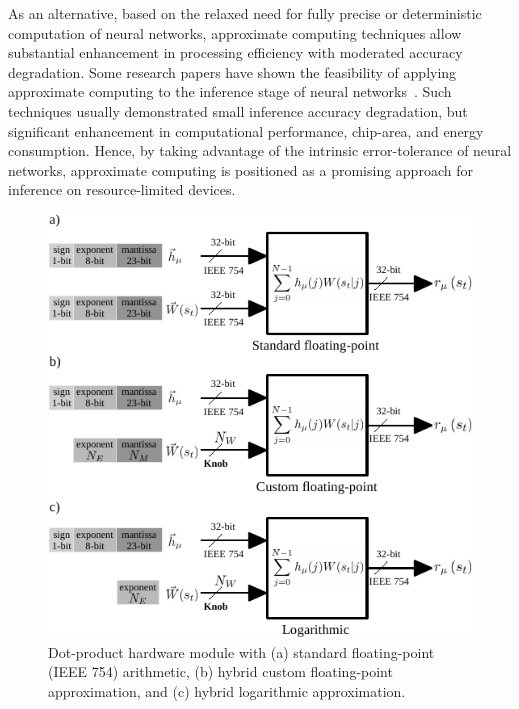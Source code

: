 As an alternative, based on the relaxed need for fully precise or deterministic computation of neural networks, approximate computing techniques allow substantial enhancement in processing efficiency with moderated accuracy degradation. Some research papers have shown the feasibility of applying approximate computing to the inference stage of neural networks~\cite{lotrivc2012applicability, sarwar2016multiplier, mrazek2016design, du2014leveraging}. Such techniques usually demonstrated small inference accuracy degradation, but significant enhancement in computational performance, chip-area, and energy consumption. Hence, by taking advantage of the intrinsic error-tolerance of neural networks, approximate computing is positioned as a promising approach for inference on resource-limited devices.

\begin{figure}[b!]
	\centering
	\includegraphics[width=0.5\columnwidth]{./chapters/sbs_accelerator/figures/dot-product_unit.pdf}
	\caption{Dot-product hardware module with (a) standard floating-point (IEEE 754) arithmetic, (b) hybrid custom floating-point approximation, and (c) hybrid logarithmic approximation.}
	\label{fig:dot_product_unit}
\end{figure}

